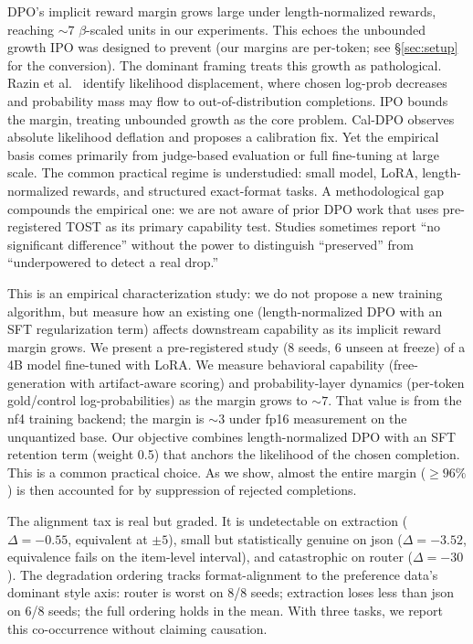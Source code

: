 \documentclass{article}
\begin{document}
DPO's implicit reward margin grows large under length-normalized rewards, reaching ${\sim}7$ $\beta$-scaled units in our experiments. This echoes the unbounded growth IPO was designed to prevent (our margins are per-token; see \S\ref{sec:setup} for the conversion). The dominant framing treats this growth as pathological. Razin et al.\ \cite{razin2025displacement} identify likelihood displacement, where chosen log-prob decreases and probability mass may flow to out-of-distribution completions. IPO \cite{azar2024ipo} bounds the margin, treating unbounded growth as the core problem. Cal-DPO \cite{xiao2024caldpo} observes absolute likelihood deflation and proposes a calibration fix. Yet the empirical basis comes primarily from judge-based evaluation or full fine-tuning at large scale. The common practical regime is understudied: small model, LoRA, length-normalized rewards, and structured exact-format tasks. A methodological gap compounds the empirical one: we are not aware of prior DPO work that uses pre-registered TOST as its primary capability test. Studies sometimes report ``no significant difference'' without the power to distinguish ``preserved'' from ``underpowered to detect a real drop.''

This is an empirical characterization study: we do not propose a new training algorithm, but measure how an existing one (length-normalized DPO with an SFT regularization term) affects downstream capability as its implicit reward margin grows. We present a pre-registered study (8 seeds, 6 unseen at freeze) of a 4B model fine-tuned with LoRA. We measure behavioral capability (free-generation with artifact-aware scoring) and probability-layer dynamics (per-token gold/control log-probabilities) as the margin grows to ${\sim}7$. That value is from the nf4 training backend; the margin is ${\sim}3$ under fp16 measurement on the unquantized base. Our objective combines length-normalized DPO with an SFT retention term (weight 0.5) that anchors the likelihood of the chosen completion. This is a common practical choice. As we show, almost the entire margin (${\geq}96\%$) is then accounted for by suppression of rejected completions.

The alignment tax is real but graded. It is undetectable on extraction ($\Delta = -0.55$, equivalent at $\pm5$), small but statistically genuine on json ($\Delta = -3.52$, equivalence fails on the item-level interval), and catastrophic on router ($\Delta = -30$). The degradation ordering tracks format-alignment to the preference data's dominant style axis: router is worst on 8/8 seeds; extraction loses less than json on 6/8 seeds; the full ordering holds in the mean. With three tasks, we report this co-occurrence without claiming causation.
\end{document}
